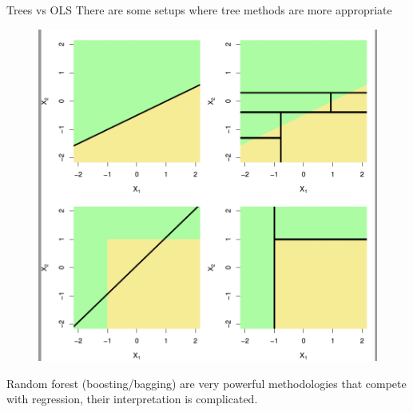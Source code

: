 \documentclass[11pt, aspectratio=43]{beamer}
\begin{document}
\begin{frame}{Trees vs OLS}
	There are some setups where tree methods are more appropriate
	\begin{figure}[h]
	\centering
	\includegraphics[scale=0.30]{Figures/fig_trees_vs_ols.png}
\end{figure}			
	
Random forest (boosting/bagging) are very powerful methodologies that compete with regression, their interpretation is complicated.

\end{frame}

\end{document}
